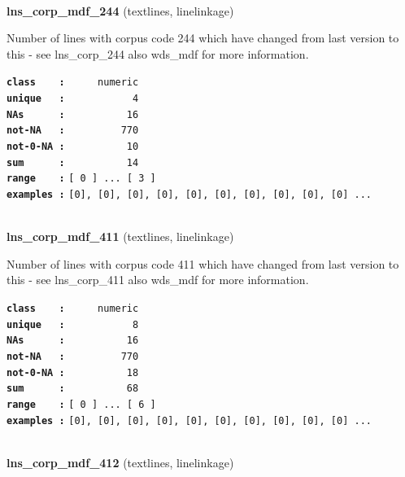 \documentclass[]{article}
\begin{document}
~

\textbf{lns\_corp\_mdf\_244} (textlines, linelinkage)

Number of lines with corpus code 244 which have changed from last
version to this - see lns\_corp\_244 also wds\_mdf for more information.

\textbf{\texttt{class\ \ \ \ :}} \texttt{~~~~~numeric}\\
\textbf{\texttt{unique\ \ \ :}} \texttt{~~~~~~~~~~~4}\\
\textbf{\texttt{NAs\ \ \ \ \ \ :}} \texttt{~~~~~~~~~~16}\\
\textbf{\texttt{not-NA\ \ \ :}} \texttt{~~~~~~~~~770}\\
\textbf{\texttt{not-0-NA\ :}} \texttt{~~~~~~~~~~10}\\
\textbf{\texttt{sum\ \ \ \ \ \ :}} \texttt{~~~~~~~~~~14}\\
\textbf{\texttt{range\ \ \ \ :}}
\texttt{{[}\ 0\ {]}\ ...\ {[}\ 3\ {]}}\\
\textbf{\texttt{examples\ :}}
\texttt{{[}0{]},\ {[}0{]},\ {[}0{]},\ {[}0{]},\ {[}0{]},\ {[}0{]},\ {[}0{]},\ {[}0{]},\ {[}0{]},\ {[}0{]}\ ...}\\

~

\textbf{lns\_corp\_mdf\_411} (textlines, linelinkage)

Number of lines with corpus code 411 which have changed from last
version to this - see lns\_corp\_411 also wds\_mdf for more information.

\textbf{\texttt{class\ \ \ \ :}} \texttt{~~~~~numeric}\\
\textbf{\texttt{unique\ \ \ :}} \texttt{~~~~~~~~~~~8}\\
\textbf{\texttt{NAs\ \ \ \ \ \ :}} \texttt{~~~~~~~~~~16}\\
\textbf{\texttt{not-NA\ \ \ :}} \texttt{~~~~~~~~~770}\\
\textbf{\texttt{not-0-NA\ :}} \texttt{~~~~~~~~~~18}\\
\textbf{\texttt{sum\ \ \ \ \ \ :}} \texttt{~~~~~~~~~~68}\\
\textbf{\texttt{range\ \ \ \ :}}
\texttt{{[}\ 0\ {]}\ ...\ {[}\ 6\ {]}}\\
\textbf{\texttt{examples\ :}}
\texttt{{[}0{]},\ {[}0{]},\ {[}0{]},\ {[}0{]},\ {[}0{]},\ {[}0{]},\ {[}0{]},\ {[}0{]},\ {[}0{]},\ {[}0{]}\ ...}\\

~

\textbf{lns\_corp\_mdf\_412} (textlines, linelinkage)
\end{document}
